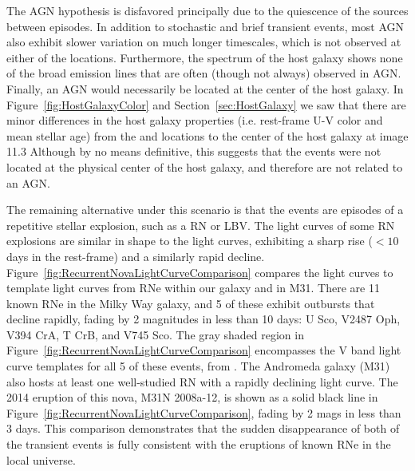 The AGN hypothesis is disfavored principally due to the quiescence of
the \spock sources between episodes. In addition to stochastic and
brief transient events, most AGN also exhibit slower
variation on much longer timescales, which is not observed at either
of the \spock locations. Furthermore, the spectrum of the \spock host
galaxy shows none of the broad emission lines that are often (though
not always) observed in AGN.  Finally, an AGN would necessarily be
located at the center of the host galaxy.
In Figure~\ref{fig:HostGalaxyColor} and Section~\ref{sec:HostGalaxy}
we saw that there are minor differences in the host galaxy properties
(i.e. rest-frame U-V color and mean stellar age) from the \spockone
and \spocktwo locations to the center of the host galaxy at image 11.3
Although by no means definitive, this suggests that the \spock events
were not located at the physical center of the host galaxy, and
therefore are not related to an AGN.

The remaining alternative under this scenario is that the \spock
events are episodes of a repetitive stellar explosion, such as a RN or
LBV.  The light curves of some RN explosions are similar in shape to
the \spock light curves, exhibiting a sharp rise ($<10$ days in the
rest-frame) and a similarly rapid decline.
Figure~\ref{fig:RecurrentNovaLightCurveComparison} compares the \spock
light curves to template light curves from RNe within our galaxy and
in M31.  There are 11 known RNe in the Milky Way galaxy, and 5 of
these exhibit outbursts that decline rapidly, fading by 2 magnitudes
in less than 10 days: U Sco, V2487 Oph, V394 CrA, T CrB, and V745 Sco.
The gray shaded region in
Figure~\ref{fig:RecurrentNovaLightCurveComparison} encompasses the V
band light curve templates for all 5 of these events, from
\citet{Schaefer:2010}.  The Andromeda galaxy (M31) also hosts at least
one well-studied RN with a rapidly declining light curve.  The 2014
eruption of this nova, M31N 2008a-12, is shown as a solid black line
in Figure~\ref{fig:RecurrentNovaLightCurveComparison}, fading by 2
mags in less than 3 days.  This comparison demonstrates that the
sudden disappearance of both of the \spock transient events is fully
consistent with the eruptions of known RNe in the local universe.





